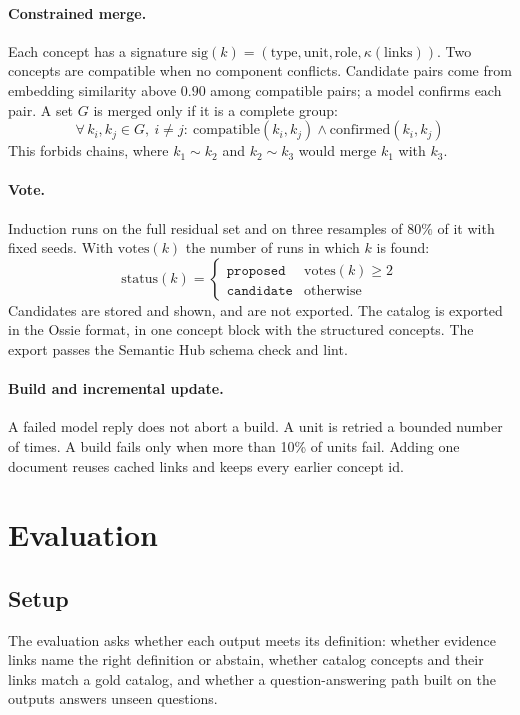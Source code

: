 \documentclass[11pt,a4paper]{article}
\begin{document}
\paragraph{Constrained merge.}
Each concept has a signature $\mathrm{sig}(k) = (\text{type}, \text{unit}, \text{role}, \kappa(\text{links}))$. Two concepts are compatible when no component conflicts. Candidate pairs come from embedding similarity above $0.90$ among compatible pairs; a model confirms each pair. A set $G$ is merged only if it is a complete group:
\begin{equation}
\forall\, k_i, k_j \in G,\ i \ne j:\ \mathrm{compatible}(k_i,k_j) \wedge \mathrm{confirmed}(k_i,k_j)
\end{equation}
This forbids chains, where $k_1{\sim}k_2$ and $k_2{\sim}k_3$ would merge $k_1$ with $k_3$.

\paragraph{Vote.}
Induction runs on the full residual set and on three resamples of $80\%$ of it with fixed seeds. With $\mathrm{votes}(k)$ the number of runs in which $k$ is found:
\begin{equation}
\mathrm{status}(k) = \begin{cases}\texttt{proposed} & \mathrm{votes}(k) \ge 2\\ \texttt{candidate} & \text{otherwise}\end{cases}
\end{equation}
Candidates are stored and shown, and are not exported. The catalog is exported in the Ossie format, in one concept block with the structured concepts. The export passes the Semantic Hub schema check and lint. %

\paragraph{Build and incremental update.}
A failed model reply does not abort a build. A unit is retried a bounded number of times. A build fails only when more than 10\% of units fail. %
Adding one document reuses cached links and keeps every earlier concept id. %

\section{Evaluation}\label{sec:eval}
\subsection{Setup}
The evaluation asks whether each output meets its definition: whether evidence links name the right definition or abstain, whether catalog concepts and their links match a gold catalog, and whether a question-answering path built on the outputs answers unseen questions.
\end{document}
